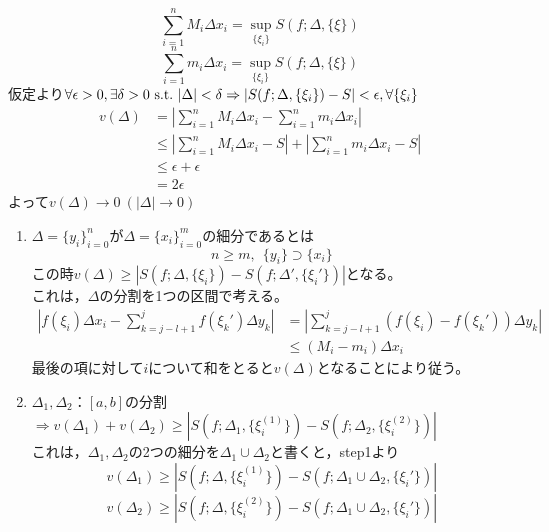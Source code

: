\documentclass[dvipdfmx,a4j,10pt]{jsarticle}
\makeatletter
\theoremstyle{mystyle1}
\theoremstyle{mystyle2}
\renewenvironment{proof}[1][\proofname]{\par
  \pushQED{\qed}%
  \normalfont
  \topsep6\p@\@plus6\p@ \trivlist
  \item[\hskip\labelsep{\bfseries\sffamily #1}]\ignorespaces
}{%
  \popQED\endtrivlist\@endpefalse
}
\renewcommand\proofname{証明}
\makeatother
\begin{document}
\begin{proof}[定理\ref{def10.2}の証明]\
    \\
    \\
    \[
    \sum_{i=1}^n M_i\Delta x_i =\sup_{\{\xi_i\}}S(f;\Delta,\{\xi\})
    \]
    \[
    \sum_{i=1}^n m_i\Delta x_i =\sup_{\{\xi_i\}}S(f;\Delta,\{\xi\})
    \]
    仮定より$\forall\epsilon>0,\exists\delta>0\ {\rm s.t.\ }|\Delta|<\delta\Rightarrow |S(f;\Delta,\{\xi_i\})-S|<\epsilon,\forall\{\xi_i\}$
    \[
    \begin{split}
    v(\Delta)
    &=\left|\sum_{i=1}^n M_i\Delta x_i-\sum_{i=1}^n m_i\Delta x_i\right|\\
    &\leq\left|\sum_{i=1}^n M_i\Delta x_i-S\right|+\left|\sum_{i=1}^n m_i \Delta x_i-S\right|\\
    &\leq\epsilon+\epsilon\\
    &=2\epsilon
    \end{split}
    \]
    よって$v(\Delta)\to0\ (|\Delta|\to0)$\\
    \begin{enumerate}
    \renewcommand{\labelenumi}{Step\arabic{enumi}.}
    \item
    $\Delta=\{y_i\}_{i=0}^n$が$\Delta=\{x_i\}_{i=0}^m$の細分であるとは
    \[
    n\geq m,\ \ \{y_i\}\supset\{x_i\}
    \]
    この時$v(\Delta)\geq|S(f;\Delta,\{\xi_i\})-S(f;\Delta',\{\xi_i'\})|$となる。\\
    これは，$\Delta$の分割を1つの区間で考える。
    \[
    \begin{split}
    \left|f(\xi_i)\Delta x_i-\sum_{k=j-l+1}^jf(\xi_k')\Delta y_k\right|
    &=
    \left|\sum_{k=j-l+1}^j(f(\xi_i)-f(\xi_k'))\Delta y_k\right|\\
    &\leq(M_i-m_i)\Delta x_i
    \end{split}
    \]
    最後の項に対して$i$について和をとると$v(\Delta)$となることにより従う。
    \item $\Delta_1,\Delta_2：[a,b]$の分割$\Rightarrow v(\Delta_1)+v(\Delta_2)\geq|S(f;\Delta_1,\{\xi_i^{(1)}\})-S(f;\Delta_2,\{\xi_i^{(2)}\})|$
    \\
    これは，$\Delta_1,\Delta_2$の2つの細分を$\Delta_1\cup\Delta_2$と書くと，step1より
    \[
    v(\Delta_1)\geq|S(f;\Delta,\{\xi_i^{(1)}\})-S(f;\Delta_1\cup\Delta_2,\{\xi_i'\})|
    \]
    \[
    v(\Delta_2)\geq|S(f;\Delta,\{\xi_i^{(2)}\})-S(f;\Delta_1\cup\Delta_2,\{\xi_i'\})|
\]
\end{enumerate}
\end{proof}
\end{document}
